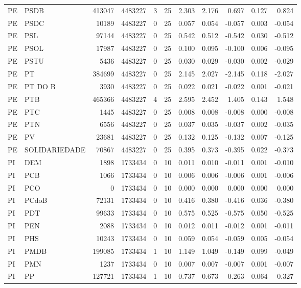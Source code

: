 \begin{landscape}
\begin{longtable}{llrrrrrrrrr}
PE & PSDB & 413047 & 4483227 & 3 & 25 & 2.303 & 2.176 & 0.697 & 0.127 & 0.824 \\
PE & PSDC & 10189 & 4483227 & 0 & 25 & 0.057 & 0.054 & -0.057 & 0.003 & -0.054 \\
PE & PSL & 97144 & 4483227 & 0 & 25 & 0.542 & 0.512 & -0.542 & 0.030 & -0.512 \\
PE & PSOL & 17987 & 4483227 & 0 & 25 & 0.100 & 0.095 & -0.100 & 0.006 & -0.095 \\
PE & PSTU & 5436 & 4483227 & 0 & 25 & 0.030 & 0.029 & -0.030 & 0.002 & -0.029 \\
PE & PT & 384699 & 4483227 & 0 & 25 & 2.145 & 2.027 & -2.145 & 0.118 & -2.027 \\
PE & PT DO B & 3930 & 4483227 & 0 & 25 & 0.022 & 0.021 & -0.022 & 0.001 & -0.021 \\
PE & PTB & 465366 & 4483227 & 4 & 25 & 2.595 & 2.452 & 1.405 & 0.143 & 1.548 \\
PE & PTC & 1445 & 4483227 & 0 & 25 & 0.008 & 0.008 & -0.008 & 0.000 & -0.008 \\
PE & PTN & 6556 & 4483227 & 0 & 25 & 0.037 & 0.035 & -0.037 & 0.002 & -0.035 \\
PE & PV & 23681 & 4483227 & 0 & 25 & 0.132 & 0.125 & -0.132 & 0.007 & -0.125 \\
PE & SOLIDARIEDADE & 70867 & 4483227 & 0 & 25 & 0.395 & 0.373 & -0.395 & 0.022 & -0.373 \\
PI & DEM & 1898 & 1733434 & 0 & 10 & 0.011 & 0.010 & -0.011 & 0.001 & -0.010 \\
PI & PCB & 1066 & 1733434 & 0 & 10 & 0.006 & 0.006 & -0.006 & 0.001 & -0.006 \\
PI & PCO & 0 & 1733434 & 0 & 10 & 0.000 & 0.000 & 0.000 & 0.000 & 0.000 \\
PI & PCdoB & 72131 & 1733434 & 0 & 10 & 0.416 & 0.380 & -0.416 & 0.036 & -0.380 \\
PI & PDT & 99633 & 1733434 & 0 & 10 & 0.575 & 0.525 & -0.575 & 0.050 & -0.525 \\
PI & PEN & 2088 & 1733434 & 0 & 10 & 0.012 & 0.011 & -0.012 & 0.001 & -0.011 \\
PI & PHS & 10243 & 1733434 & 0 & 10 & 0.059 & 0.054 & -0.059 & 0.005 & -0.054 \\
PI & PMDB & 199085 & 1733434 & 1 & 10 & 1.149 & 1.049 & -0.149 & 0.099 & -0.049 \\
PI & PMN & 1237 & 1733434 & 0 & 10 & 0.007 & 0.007 & -0.007 & 0.001 & -0.007 \\
PI & PP & 127721 & 1733434 & 1 & 10 & 0.737 & 0.673 & 0.263 & 0.064 & 0.327 \\

\end{longtable}
\end{landscape}
